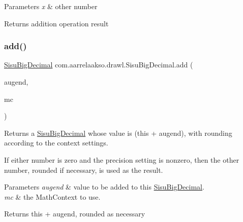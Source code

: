\begin{DoxyParams}{Parameters}
{\em x} & other number \\
\hline
\end{DoxyParams}
\begin{DoxyReturn}{Returns}
addition operation result 
\end{DoxyReturn}
\mbox{\label{classcom_1_1aarrelaakso_1_1drawl_1_1_sisu_big_decimal_ac90515f60f6f93b09d76ea389ffe689a}} 
\subsubsection{\texorpdfstring{add()}{add()}\hspace{0.1cm}{\footnotesize\ttfamily [3/3]}}
{\footnotesize\ttfamily \hyperlink{classcom_1_1aarrelaakso_1_1drawl_1_1_sisu_big_decimal}{Sisu\+Big\+Decimal} com.\+aarrelaakso.\+drawl.\+Sisu\+Big\+Decimal.\+add (\begin{DoxyParamCaption}\item[{\hyperlink{classcom_1_1aarrelaakso_1_1drawl_1_1_sisu_big_decimal}{Sisu\+Big\+Decimal}}]{augend,  }\item[{Math\+Context}]{mc }\end{DoxyParamCaption})\hspace{0.3cm}{\ttfamily [protected]}}



Returns a \hyperlink{classcom_1_1aarrelaakso_1_1drawl_1_1_sisu_big_decimal}{Sisu\+Big\+Decimal} whose value is (this + augend), with rounding according to the context settings. 

If either number is zero and the precision setting is nonzero, then the other number, rounded if necessary, is used as the result.


\begin{DoxyParams}{Parameters}
{\em augend} & value to be added to this \hyperlink{classcom_1_1aarrelaakso_1_1drawl_1_1_sisu_big_decimal}{Sisu\+Big\+Decimal}. \\
\hline
{\em mc} & the Math\+Context to use. \\
\hline
\end{DoxyParams}
\begin{DoxyReturn}{Returns}
this + augend, rounded as necessary 
\end{DoxyReturn}

